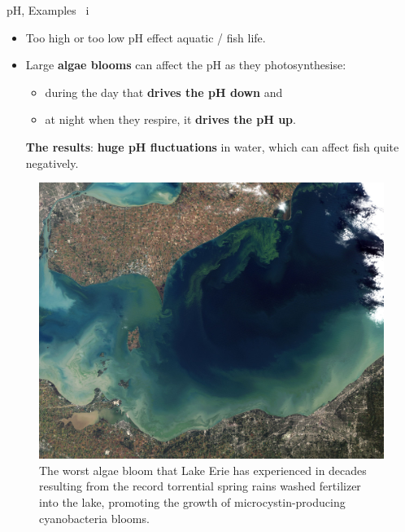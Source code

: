\begin{frame}{pH, Examples \, i}
	
	\lcol
	\vskip -5pt
	\begin{itemize}
		\item Too high or too low pH effect aquatic / fish life. 
		\pause
		\item 
	Large \alert{\textbf{algae blooms}} can affect the pH as they photosynthesise: 
	\begin{itemize}
		\item during the day that \textbf{drives the pH down} and 
		\item at night when they respire, it \textbf{drives the pH up}.
	\end{itemize}
	\alert{\textbf{The results}}: \textbf{huge pH fluctuations} in water, which can affect fish quite negatively. 
	\end{itemize}
	\rcol
	\begin{figure}
		\centering
		\includegraphics[width=0.85\columnwidth]{figures/chemical-equilibrium/toxic_algae_bloom_lake_erie.jpg}
		\caption{\small The worst algae bloom that Lake Erie has experienced in decades resulting from the record torrential spring rains washed fertilizer into the lake, promoting the growth of microcystin-producing cyanobacteria blooms.}
	\end{figure}

	\ecol
	
\end{frame}
%

